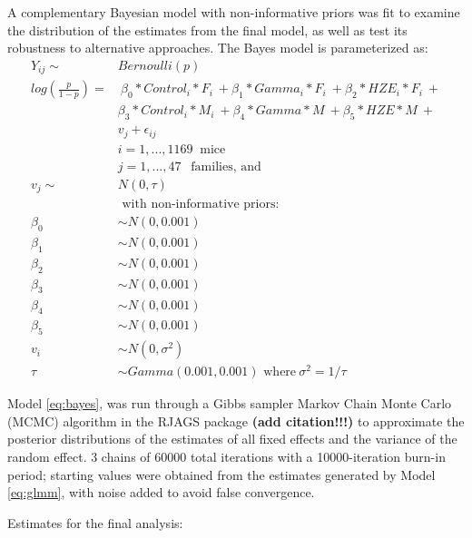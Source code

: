 \documentclass[12pt]{article}
\begin{document}
A complementary Bayesian model with non-informative priors was fit to examine the distribution of the estimates from the final model, as well as test its robustness to alternative approaches. The Bayes model is parameterized as:\\
\begin{equation}
\begin{aligned}
Y_{ij} \sim &Bernoulli(p)\\
log(\frac{p}{1-p}) = &\ \beta_0*Control_i*F_i\ +\beta_1*Gamma_i*F_i\ + \beta_2*HZE_i*F_i\ + \\ &\beta_3*Control_i*M_i\ +\beta_4*Gamma*M\ + \beta_5*HZE*M\ + \\
&v_{j} + \epsilon_{ij}\\
&i = 1, ..., 1169\ \mbox{ mice} \\
&j = 1,...,47\ \ \mbox{ families, and} \\
v_j \sim\ &N(0, \tau)
\\
&\mbox{ with non-informative priors:}\\
\beta_0 &\sim N(0, 0.001)\\
\beta_1 &\sim N(0, 0.001)\\
\beta_2 &\sim N(0, 0.001)\\
\beta_3 &\sim N(0, 0.001)\\
\beta_4 &\sim N(0, 0.001)\\
\beta_5 &\sim N(0, 0.001)\\
v_i &\sim N(0, \sigma^2)\\
\tau &\sim Gamma(0.001, 0.001) \mbox{ where}\ \sigma^2 = 1/\tau 
\end{aligned}
\label{eq:bayes}
\end{equation}

Model \eqref{eq:bayes}, was run through a Gibbs sampler Markov Chain Monte Carlo (MCMC) algorithm in the RJAGS package \textbf{(add citation!!!)} to approximate the posterior distributions of the estimates of all fixed effects and the variance of the random effect. 3 chains of 60000 total iterations with a 10000-iteration burn-in period; starting values were obtained from the estimates generated by Model \eqref{eq:glmm}, with noise added to avoid false convergence.

Estimates for the final analysis:
\end{document}
